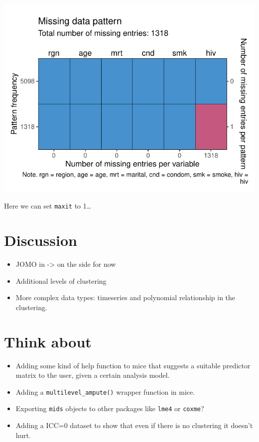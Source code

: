 \documentclass[
]{jss}
\begin{document}
\begin{CodeChunk}


\begin{center}\includegraphics{Manuscript_files/figure-latex/hiv-1} \end{center}

\end{CodeChunk}

Here we can set \texttt{maxit} to 1\ldots{}

\hypertarget{discussion}{%
\section{Discussion}\label{discussion}}

\begin{itemize}
\item
  JOMO in  -\textgreater{} on the side for now
\item
  Additional levels of clustering
\item
  More complex data types: timeseries and polynomial relationship in the
  clustering.
\end{itemize}

\hypertarget{think-about}{%
\section{Think about}\label{think-about}}

\begin{itemize}
\item
  Adding some kind of help function to mice that suggests a suitable
  predictor matrix to the user, given a certain analysis model.
\item
  Adding a \texttt{multilevel\_ampute()} wrapper function in mice.
\item
  Exporting \texttt{mids} objects to other packages like \texttt{lme4}
  or \texttt{coxme}?
\item
  Adding a ICC=0 dataset to show that even if there is no clustering it
  doesn't hurt.
\end{itemize}

\renewcommand\refname{References}

\end{document}
